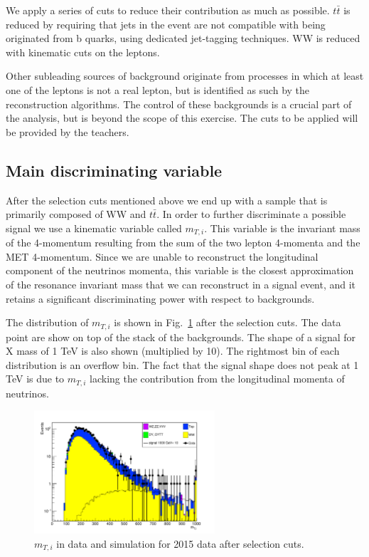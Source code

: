\documentclass[a4paper,12pt]{article}
\begin{document}
We apply a series of cuts to reduce their contribution as much as possible.
$t\bar{t}$ is reduced by requiring that jets in the event are not compatible
with being originated from b quarks, using dedicated jet-tagging techniques.
WW is reduced with kinematic cuts on the leptons.

Other subleading sources of background originate from processes in which at
least one of the leptons is not a real lepton, but is identified as such by the
reconstruction algorithms. The control of these backgrounds is a crucial part of the analysis,
but is beyond the scope of this exercise. The cuts to be applied will be
provided by the teachers.

\subsection{Main discriminating variable}
After the selection cuts mentioned above we end up
with a sample that is primarily composed of WW and $t\bar{t}$. In order to
further discriminate a possible signal we use a kinematic
variable called $m_{T,i}$. This variable is the invariant mass of the
4-momentum resulting from the sum of the two lepton 4-momenta and the MET
4-momentum. Since we are unable to reconstruct the longitudinal component of
the neutrinos momenta, this variable is the closest approximation of
the resonance invariant mass that we can reconstruct in a signal event, and it retains a
significant discriminating power with respect to backgrounds.

The distribution of  $m_{T,i}$ is shown in Fig.~\ref{fig:mti} after the
selection cuts. The data point are show on top of the stack of the
backgrounds. The shape of a signal for X mass of 1 TeV is also shown
(multiplied by 10). The rightmost bin of each distribution is an overflow bin.
The fact that the signal shape does not peak at 1 TeV is due to 
$m_{T,i}$ lacking the contribution from the longitudinal  momenta of neutrinos.
\begin{figure}[!b]
\centering
\includegraphics[width=0.6\textwidth]{images/mTi.pdf}
\caption{$m_{T,i}$ in data and simulation for 2015 data after selection cuts.\label{fig:mti}}
\end{figure}
\end{document}
